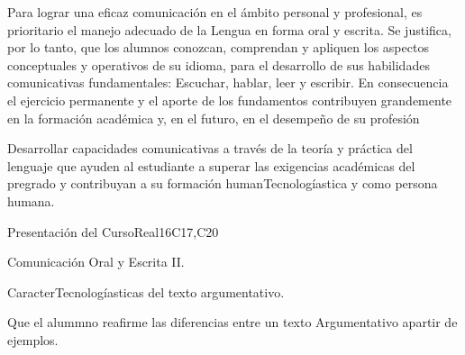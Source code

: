 \begin{syllabus}


\begin{justification}
Para lograr una eficaz comunicación en el ámbito personal y profesional, es prioritario el manejo adecuado de la Lengua en forma oral y escrita. Se justifica, por lo tanto, que los alumnos  conozcan, comprendan y apliquen los aspectos conceptuales y operativos de su idioma, para el desarrollo de sus habilidades comunicativas fundamentales: Escuchar, hablar, leer y escribir.
En consecuencia el ejercicio permanente y el aporte de los fundamentos contribuyen grandemente en la formación académica y, en el futuro, en el desempeño de su profesión
\end{justification}

\begin{goals}
\item Desarrollar capacidades comunicativas a través de la teoría y práctica del lenguaje que ayuden al estudiante a superar las exigencias académicas del pregrado y contribuyan a su formación humanTecnologíastica y como persona humana.
\end{goals}

\begin{outcomes}
   \item {}
   \item {}
   \item {}
\end{outcomes}

\begin{competences}
    \item {}
    \item {}
    \item {}
\end{competences}

\begin{unit}{Presentación del Curso}{}{Real}{16}{C17,C20}
  \begin{topics}
      \item Comunicación Oral y Escrita II.
      \item CaracterTecnologíasticas del texto argumentativo.
  \end{topics}

  \begin{learningoutcomes}
   \item Que el alummno reafirme las diferencias entre un texto Argumentativo apartir de ejemplos.
  \end{learningoutcomes}
\end{unit}


\end{syllabus}
